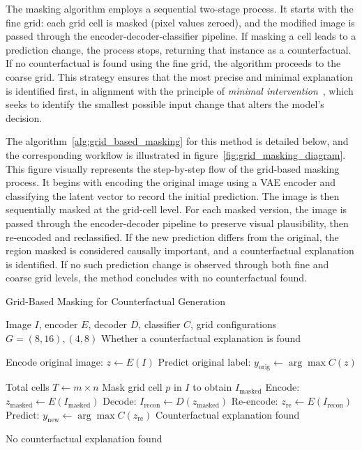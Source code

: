 The masking algorithm employs a sequential two-stage process. It starts with the fine grid: each grid cell is masked (pixel values zeroed), and the modified image is passed through the encoder-decoder-classifier pipeline. If masking a cell leads to a prediction change, the process stops, returning that instance as a counterfactual. If no counterfactual is found using the fine grid, the algorithm proceeds to the coarse grid. This strategy ensures that the most precise and minimal explanation is identified first, in alignment with the principle of \textit{minimal intervention}~\cite{wachter2018CE}, which seeks to identify the smallest possible input change that alters the model's decision.


The algorithm~\ref{alg:grid_based_masking} for this method is detailed below, and the corresponding workflow is illustrated in figure~\ref{fig:grid_masking_diagram}. This figure visually represents the step-by-step flow of the grid-based masking process. It begins with encoding the original image using a VAE encoder and classifying the latent vector to record the initial prediction. The image is then sequentially masked at the grid-cell level. For each masked version, the image is passed through the encoder-decoder pipeline to preserve visual plausibility, then re-encoded and reclassified. If the new prediction differs from the original, the region masked is considered causally important, and a counterfactual explanation is identified. If no such prediction change is observed through both fine and coarse grid levels, the method concludes with no counterfactual found.

\begin{algorithm}[htbp]
\caption{Grid-Based Masking for Counterfactual Generation}
\label{alg:grid_based_masking}
\begin{algorithmic}[1]
\REQUIRE Image $I$, encoder $E$, decoder $D$, classifier $C$, grid configurations $G = {(8,16), (4,8)}$
\ENSURE Whether a counterfactual explanation is found

\STATE Encode original image: $z \leftarrow E(I)$
\STATE Predict original label: $y_{\text{orig}} \leftarrow \arg\max C(z)$

\STATE Total cells $T \leftarrow m \times n$
\STATE Mask grid cell $p$ in $I$ to obtain $I_{\text{masked}}$
\STATE Encode: $z_{\text{masked}} \leftarrow E(I_{\text{masked}})$
\STATE Decode: $I_{\text{recon}} \leftarrow D(z_{\text{masked}})$
\STATE Re-encode: $z_{\text{re}} \leftarrow E(I_{\text{recon}})$
\STATE Predict: $y_{\text{new}} \leftarrow \arg\max C(z_{\text{re}})$
\RETURN Counterfactual explanation found
\ENDIF
\ENDFOR
\ENDFOR

\RETURN No counterfactual explanation found
\end{algorithmic}
\end{algorithm}

